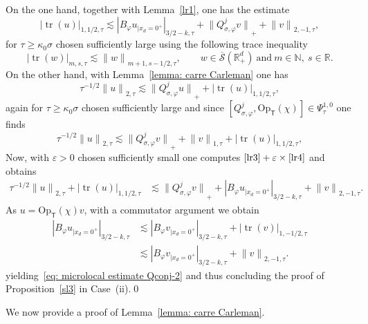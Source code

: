 \documentclass[10pt]{amsart}
\theoremstyle{plain}
\theoremstyle{definition}
\def\R{\mathbb{R}}
\def\N{\mathbb{N}}
\newcommand{\suff}{sufficiently\xspace}
\let\k\kappa
\newcommand{\br}{\ensuremath{_{|x_d=0^+}}}
\newcommand{\Opt}{\ensuremath{\mathrm{Op}_{\scriptscriptstyle{\mathsf{T}}}}}
\newcommand{\Norm}[2]{{\| #1 \|}_{#2}}
\newcommand{\Normsc}[2]{{\| #1 \|}_{#2, \tau}}
\newcommand{\normsc}[2]{{| #1 |}_{#2, \tau}}
\newcommand{\bignormsc}[2]{{\big| #1 \big|}_{#2, \tau}}
\newcommand{\Psisc}{\Psi_\tau}
\newcommand{\Qconj}{Q_{\sigma,\varphi}}
\newcommand{\Sbarp}{\ensuremath{\overline{\mathscr{S}}(\Rdp)}}
\newcommand{\Rdp}{\R^d_+}
\DeclareMathOperator{\trace}{tr}
\begin{document}
On the one hand, together with Lemma~\ref{lr1}, one has the estimate
\begin{equation}\label{lr3}
\bignormsc{\trace (u)}{1,1/2}
\lesssim
\normsc{B_{\varphi}u\br}{3/2-k}
+ \Norm{\Qconj^jv}{+}
+\Normsc{v}{2,-1},
\end{equation}
for $\tau \geq \k_0 \sigma$ chosen \suff large
using the following trace inequality
\begin{equation*}
\normsc{\trace(w)}{m,s}
\lesssim \Normsc{w}{m+1,s-1/2},
\qquad w\in \Sbarp \ \text{and} \ m\in\N, \
s\in\R.
\end{equation*}
On the other hand, with Lemma~\ref{lemma: carre Carleman} one has
\begin{equation*}
\tau^{-1/2} \Normsc{u}{2}
\lesssim
\Norm{\Qconj^j u}{+} + \normsc{\trace(u)}{1,1/2},
\end{equation*}
again for $\tau \geq \k_0 \sigma$ chosen \suff large
and since $[\Qconj^j, \Opt(\chi)]\in \Psisc^{1,0}$ one finds
\begin{equation}
\label{lr4}
\tau^{-1/2} \Normsc{u}{2}
\lesssim
\Norm{\Qconj^j v}{+} + \Normsc{v}{1} + \normsc{\trace(u)}{1,1/2},
\end{equation}
Now, with $\varepsilon>0$ chosen \suff small one computes $\eqref{lr3}
+ \varepsilon\times\eqref{lr4}$ and obtains
\begin{align*}
\tau^{-1/2} \Normsc{u}{2}
+ \normsc{\trace(u)}{1,1/2}
&\lesssim
\Norm{\Qconj^j v}{+}
+ \normsc{B_{\varphi}u\br}{3/2-k}
+\Normsc{v}{2,-1}.
\end{align*}
As $u=\Opt(\chi)v$, with a commutator argument we obtain
\begin{align*}
\normsc{B_{\varphi}u\br}{3/2-k}
& \lesssim
\normsc{B_{\varphi}v\br}{3/2-k}
+ \normsc{\trace(v)}{1,-1/2}\\
& \lesssim
\normsc{B_{\varphi}v\br}{3/2-k}
+ \Normsc{v}{2,-1}.
\end{align*}
yielding~\eqref{eq: microlocal estimate Qconj-2} and thus concluding the proof of
Proposition~\ref{sl3} in Case~(ii).\qed

\medskip

We now provide a proof of Lemma~\ref{lemma: carre Carleman}.
\end{document}
